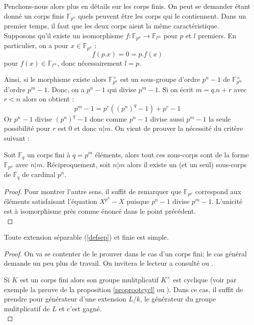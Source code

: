 \documentclass[a4paper]{article} %
\numberwithin{section}{part}
\numberwithin{equation}{section}
\newcommand\GF[1]{\mathbb{F}_{#1}}
\begin{document}
Penchons-nous alors plus en détails sur les corps finis. On peut se demander
étant donné un corps finis $\GF{p^n}$ quels peuvent être les corps qui le
contiennent. Dans un premier temps, il faut que les deux corps aient la même
caractéristique. Supposons qu'il existe un isomorphisme $f : \GF{p^n} \to 
\GF{l^m}$ pour $p$ et $l$ premiers. En particulier, on a pour $x\in\GF{p^n}$ :
\[f(p.x) = 0 = p.f(x)\]
pour $f(x)\in\GF{l^m}$, donc nécessairement $l = p$.\par
Ainsi, si le morphisme existe alors $\GF{p^n}^{\times}$ est un sous-groupe
d'ordre $p^n - 1$ de $\GF{p^m}^{\times}$ d'ordre $p^m - 1$. Donc, on a $p^n - 1$
qui divise $p^m - 1$. Si on écrit $m = q.n + r$ avec $r < n$ alors on obtient :
\[p^m - 1 = p^r((p^n)^q - 1) + p^r - 1\]
Or $p^n - 1$ divise $(p^n)^q - 1$ donc comme $p^n - 1$ divise aussi $p^m - 1$ la
seule possibilité pour $r$ est $0$ et donc $n|m$. On vient de prouver la
nécessité du critère suivant :

\begin{prop}
Soit $\GF{q}$ un corps fini à $q = p^m$ éléments, alors tout ces sous-corps sont
de la forme $\GF{p^n}$ avec $n|m$. Réciproquement, soit $n|m$ alors il existe un
(et un seul) sous-corps de $\GF{q}$ de cardinal $p^n$.
\end{prop}
\begin{proof}
Pour montrer l'autre sens, il suffit de remarquer que $\GF{p^n}$ correspond aux
éléments satisfaisant l'équation $X^{p^n} - X$ puisque $p^n - 1$ divise $p^m -
1$. L'unicité est à isomorphisme près comme énoncé dans le point précédent.\\
\end{proof}

\begin{thm}
\label{thelemprim}
Toute extension séparable (\ref{defsep}) et finie est simple.
\end{thm}
\begin{proof}
On va se contenter de le prouver dans le cas d'un corps fini; le cas général
demande un peu plus de travail. On invitera le lecteur a consulté
\cite[p.~87]{Esc} ou \cite[Chap. VIII]{Pol}.\par
Si $K$ est un corps fini alors son groupe mulitplicatif $K^{\times}$ est
cyclique (voir par exemple la preuve de la proposition \ref{proprootcycl} ou
\cite[p.~50]{LiNi}). Dans ce cas, il suffit de prendre pour générateur d'une
extension $L/k$, le générateur du groupe mulitplicatif de $L$ et c'est gagné.\\
\end{proof}
\end{document}

